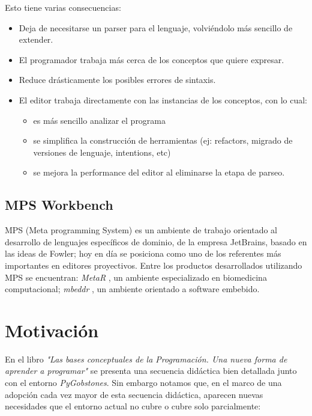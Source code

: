 Esto tiene varias consecuencias:
\begin{itemize}
  \item Deja de necesitarse un parser para el lenguaje, volviéndolo más sencillo de extender.
  \item El programador trabaja más cerca de los conceptos que quiere expresar.
  \item Reduce drásticamente los posibles errores de sintaxis.
  \item El editor trabaja directamente con las instancias de los conceptos, con lo cual:
  \begin{itemize}
    \item es más sencillo analizar el programa
    \item se simplifica la construcción de herramientas (ej: refactors, migrado de versiones de lenguaje, intentions, etc)
    \item se mejora la performance del editor al eliminarse la etapa de parseo.
  \end{itemize}
\end{itemize}


\subsection{MPS Workbench}

MPS (Meta programming System)\cite{MPS} es un ambiente de trabajo orientado al desarrollo de lenguajes específicos de dominio, de la empresa JetBrains, basado en las ideas de Fowler; hoy en día se posiciona como uno de los referentes más importantes en editores proyectivos\cite{LanguageModularity}. 
Entre los productos desarrollados utilizando MPS se encuentran: \textit{MetaR} \cite{MetaR}, un ambiente especializado en biomedicina computacional; \textit{mbeddr} \cite{mbeddr}, un ambiente orientado a software embebido.

\section{Motivación}

En el libro \textit{"Las bases conceptuales de la Programación. Una nueva forma de aprender a programar"}\cite{Gobstones} se presenta una secuencia didáctica bien detallada junto con el entorno \textit{PyGobstones}\cite{PyGobstones}. Sin embargo notamos que, en el marco de una adopción cada vez mayor de esta secuencia didáctica, aparecen nuevas necesidades que el entorno actual no cubre o cubre solo parcialmente:

